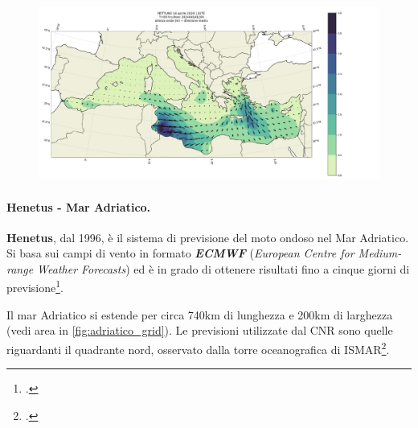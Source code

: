 \documentclass[./main.tex]{subfiles}
\begin{document}
\begin{figure}[!ht]
\noindent \begin{minipage}{\textwidth}
\vspace{1cm}
\centering
\includegraphics[width=\textwidth]{images/plot_pygrib_nettuno_202404141200.pdf}
\captionsetup{font=small, hypcap=false}
\label{fig:plot_pygrib_nettuno_202404141200}
\end{minipage}
\vspace{0.25cm}
\end{figure}

\paragraph{Henetus - Mar Adriatico.}
\textbf{Henetus}, dal 1996, è il sistema di previsione del moto ondoso nel Mar Adriatico. Si basa sui campi di vento in formato \textit{\textbf{ECMWF}} (\textit{European Centre for Medium-range Weather Forecasts}) ed è in grado di ottenere risultati fino a cinque giorni di previsione\footcite[\url{https://www.ismar.cnr.it/infrastrutture/modellistica/modelli-operativi/\#3}]{website-ismar-cnr}.\par

Il mar Adriatico si estende per circa 740km di lunghezza e 200km di larghezza (vedi area in \autoref{fig:adriatico_grid}). Le previsioni utilizzate dal CNR sono quelle riguardanti il quadrante nord, osservato dalla torre oceanografica di ISMAR\footcite[2967]{henetus-wave}.\par
\end{document}
